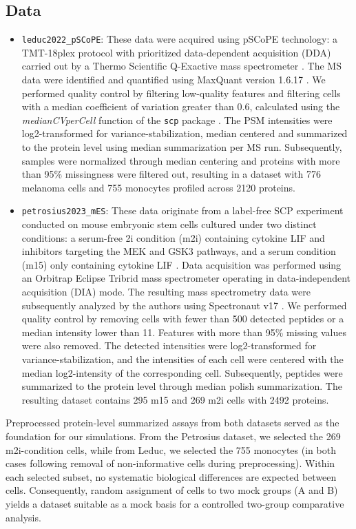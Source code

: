 \subsection{Data}
\begin{itemize}
    \item \texttt{leduc2022\_pSCoPE}: These data were acquired using pSCoPE technology: a TMT-18plex protocol with prioritized data-dependent acquisition (DDA) carried out by a Thermo Scientific Q-Exactive mass spectrometer \cite{leduc}. The MS data were identified and quantified using MaxQuant version 1.6.17 \cite{maxquant}. We performed quality control by filtering low-quality features and filtering cells with a median coefficient of variation greater than 0.6, calculated using the \textit{medianCVperCell} function of the \texttt{scp} package \cite{scp_paper}. The PSM intensities were log2-transformed for variance-stabilization, median centered and summarized to the protein level using median summarization per MS run. Subsequently, samples were normalized through median centering and proteins with more than 95\% missingness were filtered out, resulting in a dataset with 776 melanoma cells and 755 monocytes profiled across 2120 proteins.
    \item \texttt{petrosius2023\_mES}: These data originate from a label-free SCP experiment conducted on mouse embryonic stem cells cultured under two distinct conditions: a serum-free 2i condition (m2i) containing cytokine LIF and inhibitors targeting the MEK and GSK3 pathways, and a serum condition (m15) only containing cytokine LIF \cite{petro}. Data acquisition was performed using an Orbitrap Eclipse Tribrid mass spectrometer operating in data-independent acquisition (DIA) mode. The resulting mass spectrometry data were subsequently analyzed by the authors using Spectronaut v17 \cite{spectronaut}.
    We performed quality control by removing cells with fewer than 500 detected peptides or a median intensity lower than 11. Features with more than 95\% missing values were also removed. The detected intensities were log2-transformed for variance-stabilization, and the intensities of each cell were centered with the median log2-intensity of the corresponding cell. Subsequently, peptides were summarized to the protein level through median polish summarization. The resulting dataset contains 295 m15 and 269 m2i cells with 2492 proteins.
\end{itemize}
Preprocessed protein-level summarized assays from both datasets served as the foundation for our simulations. From the Petrosius dataset, we selected the 269 m2i-condition cells, while from Leduc, we selected the 755 monocytes (in both cases following removal of non-informative cells during preprocessing). Within each selected subset, no systematic biological differences are expected between cells. Consequently, random assignment of cells to two mock groups (A and B) yields a dataset suitable as a mock basis for a controlled two-group comparative analysis.

